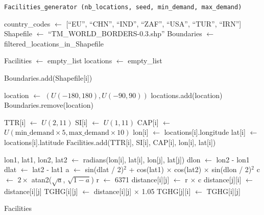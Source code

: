 \documentclass{article}
\begin{document}
	
	\setcounter{algorithm}{2}  %
	
	\begin{algorithm}
		\caption{\texttt{Facilities\_generator (nb\_locations, seed, min\_demand, max\_demand)}}
		\label{alg:facilities_generator}
		\begin{algorithmic}[1]
			
			\State country\_codes $\gets$ [``EU'', ``CHN'', ``IND'', ``ZAF'', ``USA'', ``TUR'', ``IRN'']
			\State Shapefile $\gets$ ``TM\_WORLD\_BORDERS-0.3.shp''
			\State Boundaries $\gets$ filtered\_locations\_in\_Shapefile
			
			\State Facilities $\gets$ empty\_list
			\State locations $\gets$ empty\_list
			
			\State Boundaries.add(Shapefile[i])
			\EndFor
			
			\State location $\gets$ $(U(-180,180), U(-90,90))$
			\State locations.add(location)
			\State Boundaries.remove(location)
			\EndIf
			\EndWhile
			
			\State TTR[i] $\gets$ $U(2,11)$
			\State SI[i] $\gets$ $U(1,11)$
			\State CAP[i] $\gets$ $U(\text{min\_demand} \times 5, \text{max\_demand} \times 10)$
			\State lon[i] $\gets$ locations[i].longitude
			\State lat[i] $\gets$ locations[i].latitude
			\State Facilities.add(TTR[i], SI[i], CAP[i], lon[i], lat[i])
			\EndFor
			
			\State lon1, lat1, lon2, lat2 $\gets$ radians(lon[i], lat[i], lon[j], lat[j])
			\State dlon $\gets$ lon2 - lon1 
			\State dlat $\gets$ lat2 - lat1 
			\State a $\gets$ sin(dlat / 2)$^2$ + cos(lat1) $\times$ cos(lat2) $\times$ sin(dlon / 2)$^2$
			\State c $\gets$ $2 \times$ atan2($\sqrt{a}$, $\sqrt{1 - a}$) 
			\State r $\gets$ 6371 
			\State distance[i][j] $\gets$ r $\times$ c
			\State distance[j][i] $\gets$ distance[i][j]
			\State TGHG[i][j] $\gets$ distance[i][j] $\times$ 1.05
			\State TGHG[j][i] $\gets$ TGHG[i][j]
			\EndFor
			\EndFor
			
			\State \Return Facilities
			
		\end{algorithmic}
	\end{algorithm}
	
\end{document}
